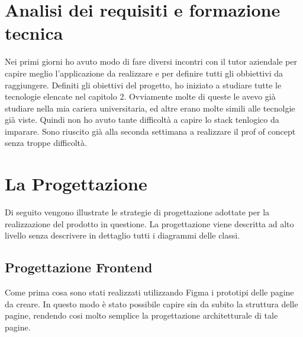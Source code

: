 \section{Analisi dei requisiti e formazione tecnica}
Nei primi giorni ho avuto modo di fare diversi incontri con il tutor aziendale per capire meglio l'applicazione da realizzare e per definire tutti gli obbiettivi da raggiungere. 
Definiti gli obiettivi del progetto, ho iniziato a studiare tutte le tecnologie elencate nel capitolo 2. Ovviamente molte di queste le avevo già studiare nella mia cariera universitaria, ed altre erano molte simili alle tecnolgie già viste. Quindi non ho avuto tante difficoltà a capire lo stack tenlogico da imparare.
 Sono riuscito già alla seconda settimana a realizzare il prof of concept senza troppe difficoltà.  
\section{La Progettazione}

Di seguito vengono illustrate le strategie di progettazione adottate per la realizzazione del prodotto in questione. La progettazione viene descritta ad alto livello senza descrivere in dettaglio tutti i diagrammi delle classi.
\subsection{Progettazione Frontend}
\label{sec:progettazione}
Come prima cosa sono stati realizzati utilizzando Figma i prototipi delle pagine da creare. In questo modo è stato possibile capire sin da subito la struttura delle pagine, rendendo cosi molto semplice la progettazione architetturale di tale pagine.
